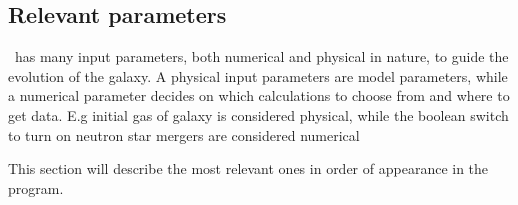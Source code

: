 


\FloatBarrier

\subsection{Relevant parameters}
\label{sec:omega-parameters}
\omegamodel\ has many input parameters, both numerical and physical in nature, to guide the evolution of the galaxy. A physical input parameters are model parameters, while a numerical parameter decides on which calculations to choose from and where to get data. E.g initial gas of galaxy is considered physical, while the boolean switch to turn on neutron star mergers are considered numerical

This section will describe the most relevant ones in order of appearance in the program.


